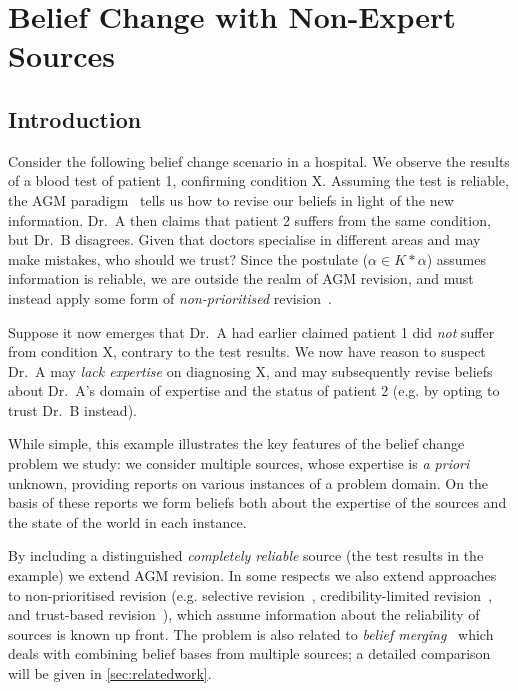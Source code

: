 \chapter{Belief Change with Non-Expert Sources}

\section{Introduction}

Consider the following belief change scenario in a hospital. We observe the
results of a blood test of patient 1, confirming condition X. Assuming the test
is reliable, the AGM paradigm~\cite{alchourron1985logic} tells us how to revise
our beliefs in light of the new information. Dr.\ A then claims that patient 2
suffers from the same condition, but Dr.\ B disagrees. Given that doctors
specialise in different areas and may make mistakes, who should we trust?
%
Since the  postulate ($\alpha \in K \ast \alpha$)
assumes information is reliable, we are outside the realm of AGM revision, and
must instead apply some form of \emph{non-prioritised}
revision~\cite{hansson1999survey}.

Suppose it now emerges that Dr.\ A had earlier claimed patient 1 did \emph{not}
suffer from condition X, contrary to the test results. We now have reason to
suspect Dr.\ A may \emph{lack expertise} on diagnosing X, and may subsequently
revise beliefs about Dr.\ A's domain of expertise and the status of patient
2 (e.g. by opting to trust Dr.\ B instead).

While simple, this example illustrates the key features of the belief change
problem we study: we consider multiple sources, whose expertise is \emph{a
priori} unknown, providing reports on various instances of a problem domain. On
the basis of these reports we form beliefs both about the expertise of the
sources and the state of the world in each instance.

By including a distinguished \emph{completely reliable} source (the test
results in the example) we extend AGM revision. In some respects we also extend
approaches to non-prioritised revision (e.g. selective
revision~\cite{ferme1999selective}, credibility-limited
revision~\cite{hansson_2001}, and trust-based
revision~\cite{booth_trust_2018}), which assume information about the
reliability of sources is known up front. The problem is also related to
\emph{belief merging}~\cite{konieczny2002merging} which deals
with combining belief bases from multiple sources; a detailed comparison will
be given in \cref{sec:relatedwork}.

